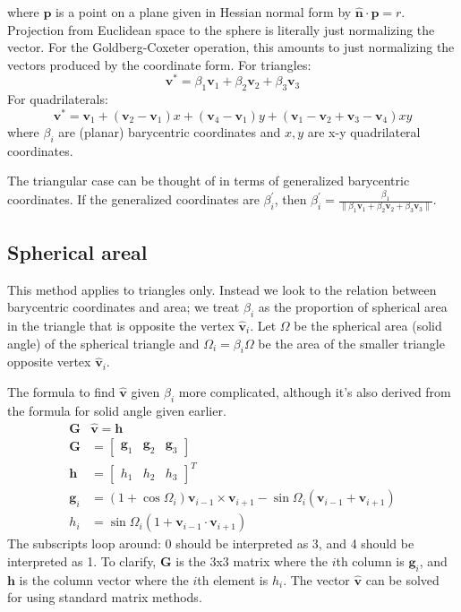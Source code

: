 \documentclass{amsart}[12pt]
\begin{document}
where $\mathbf p$ is a point on a plane given in Hessian normal
form by $\hat{\mathbf n} \cdot \mathbf p = r$. Projection from Euclidean
space to the sphere is literally just normalizing the vector. For the Goldberg-Coxeter operation, this amounts to just normalizing
the vectors produced by the coordinate form. For triangles:
\begin{equation}
   \mathbf v^* =
   \beta_1 \mathbf v_1 + \beta_2 \mathbf v_2 + \beta_3 \mathbf v_3
\end{equation}
For quadrilaterals:
\begin{equation}
   \mathbf v^* = \mathbf v_1 + (\mathbf v_2-\mathbf v_1) x +
   (\mathbf v_4-\mathbf v_1) y +
   (\mathbf v_1-\mathbf v_2+\mathbf v_3-\mathbf v_4)xy
 \end{equation}
where $\beta_i$ are (planar) barycentric coordinates and $x,y$ are
x-y quadrilateral coordinates.

The triangular case can be thought of in terms of generalized
barycentric coordinates. If the generalized coordinates are
$\beta^\prime_i$, then $\beta^\prime_i = \frac{\beta_1}
{\|\beta_1 \mathbf v_1 + \beta_2 \mathbf v_2 + \beta_3 \mathbf v_3\|}$.

\subsection{Spherical areal}
This method applies to triangles only. Instead we look to the relation between
barycentric coordinates and area; we treat $\beta_i$ as the proportion of
spherical area in the triangle that is opposite the vertex $\hat{\mathbf v}_i$.
Let $\Omega$ be the spherical area (solid angle) of the spherical triangle and
$\Omega_i = \beta_i\Omega$ be the area of the smaller triangle opposite vertex
$\hat{\mathbf v}_i$.

The formula to find $\hat{\mathbf v}$ given $\beta_i$ more complicated,
although it's also derived from the formula for solid angle given earlier.
\begin{equation}\begin{split}
  \mathbf G & \hat{\mathbf v} = \mathbf h \\
   \mathbf G & = \begin{bmatrix} \mathbf g_1 & \mathbf g_2 & \mathbf g_3 \end{bmatrix} \\
   \mathbf h & = \begin{bmatrix} h_1  & h_2 & h_3  \end{bmatrix}^T \\
   \mathbf g_{i} & = \left(1+\cos \Omega_{i}\right) \mathbf v_{i-1} \times
   \mathbf v_{i+1} - \sin\Omega_{i}\left(\mathbf v_{i-1} + \mathbf v_{i+1}\right)\\
   h_i &= \sin\Omega_i\left(1+\mathbf v_{i-1}\cdot\mathbf v_{i+1}\right)
\end{split}\end{equation}
The subscripts loop around: 0 should be interpreted as 3, and 4 should be
interpreted as 1. To clarify, $\mathbf G$ is the 3x3 matrix where the $i$th
column is $\mathbf g_i$, and $\mathbf h$ is the column vector where the
$i$th element is $h_i$. The vector $\hat{\mathbf v}$
can be solved for using standard matrix methods.
\end{document}
